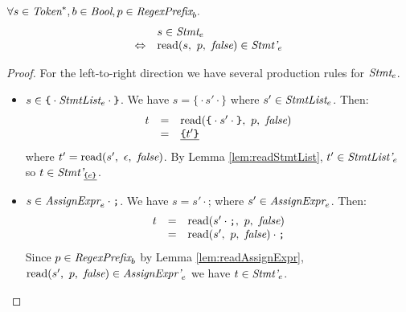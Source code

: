 \documentclass[preprint,10pt]{sigplanconf}
\begin{document}
\begin{lemma}\mbox{}
  
  \( \forall s \in \textit{Token}^*, b \in \textit{Bool}, p \in \textit{RegexPrefix}_b. \)
  \[
  \begin{array}{rl}
  &s \in \textit{Stmt}_{e} 
  \\
  \Leftrightarrow &
  \textrm{read}(s,~p,~\textit{false}) \in \textit{Stmt'}_{e}
  \end{array}
  \]
\end{lemma}
\begin{proof}
  For the left-to-right direction we have several production rules for
  \( \textit{Stmt}_{e} \).
  \begin{itemize}

  \item \( s \in \texttt{\{} \cdot \textit{StmtList}_{e} \cdot \texttt{\}} \). 
    We have \( s =
    \texttt{\{} \cdot s' \cdot \texttt{\}} \) where \( s' \in \textit{StmtList}_{e} \). Then:
    \[
    \begin{array}{rcl}
      t &=& \textrm{read}(\texttt{\{} \cdot s' \cdot \texttt{\}},~p,~\textit{false})
      \\
      &=& \underline{ \texttt{\{} t' \texttt{\}} }
    \end{array}
    \]
    where \( t' = \textrm{read}(s',~\epsilon,~\textit{false}) \). By Lemma
    \ref{lem:readStmtList}, \( t' \in \textit{StmtList'}_{e} \)
    so \( t \in \textit{Stmt'}_{\underline{ \texttt{\{} e \texttt{\}} }} \).


  \item \( s \in \textit{AssignExpr}_{e} \cdot \texttt{;}
    \). We have \( s = s' \cdot \texttt{;} \) where \( s' \in
    \textit{AssignExpr}_{e} \). Then:
    \[
    \begin{array}{rcl}
      t &=& \textrm{read}(s'\cdot \texttt{;},~p,~\textit{false})
      \\
      &=& \textrm{read}(s',~p,~\textit{false}) \cdot \texttt{;}
    \end{array}
    \]
    Since \( p \in \textit{RegexPrefix}_b \) by Lemma
    \ref{lem:readAssignExpr}, \( \textrm{read}(s',~p,~\textit{false}) \in
    \textit{AssignExpr'}_{e} \) we have \( t \in
    \textit{Stmt'}_{e} \).


\end{itemize}
\end{proof}
\end{document}
